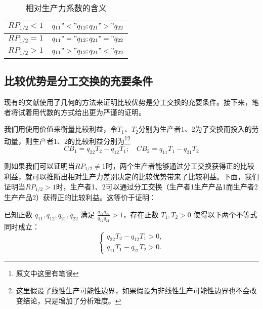 \begin{table}
    \centering
    \caption{相对生产力系数的含义\cite[48-49]{CaiJiMingCongXiaYiJieZhiLunDaoGuangYiJieZhiLunXiuDingBan2022}}
    \label{table:RP_{1/2}}
    \begin{tabular}{|l|l|}
    \hline
        $\mathit{RP}_{1/2}<1$ & $q_{11} \quad "<" \quad q_{12}; \quad q_{21} \quad ">" \quad q_{22}$ \\ \hline
        $\mathit{RP}_{1/2}=1$ & $q_{11} \quad "=" \quad q_{12}; \quad q_{21} \quad "=" \quad q_{22}$ \\ \hline
        $\mathit{RP}_{1/2}>1$ & $q_{11} \quad ">" \quad q_{12}; \quad q_{21} \quad "<" \quad q_{22}$ \\ \hline
    \end{tabular}
\end{table}

\subsection{比较优势是分工交换的充要条件}

现有的文献使用了几何的方法来证明比较优势是分工交换的充要条件。接下来，笔者将试着用代数的方式给出更为严谨的证明。

我们用使用价值来衡量比较利益\cite[63]{CaiJiMingGuangYiJieZhiLun2001}，令$T_1$、$T_2$分别为生产者1、2为了交换而投入的劳动量，则生产者1、2的比较利益分别为\footnote{原文中这里有笔误}\footnote{这里假设了线性生产可能性边界，如果假设为非线性生产可能性边界也不会改变结论，只是增加了分析难度\cite[285]{LiRenJunJieZhiLiLun2004}。}
\begin{equation}
    \mathit{CB}_1 = q_{22}T_2 - q_{12}T_1 ; \quad \mathit{CB}_2 = q_{11}T_1 - q_{21}T_2  
\end{equation}

则如果我们可以证明当$\mathit{RP}_{1/2} \neq 1$时，两个生产者能够通过分工交换获得正的比较利益，就可以推断出相对生产力差别决定的比较优势带来了比较利益。下面，我们证明当$RP_{1/2} > 1$时，生产者1、2可以通过分工交换（生产者1生产产品1而生产者2生产产品2）获得正的比较利益。这等价于证明：

\begin{proposition}
    已知正数 $ q_{11}, q_{12}, q_{21}, q_{22} $ 满足 $\frac{q_{11}q_{22}}{q_{12}q_{21}} > 1$，存在正数 $T_1,T_2 > 0$ 使得以下两个不等式同时成立：
    $$
        \begin{cases}
            q_{22}T_2 - q_{12}T_1 > 0, \\
            q_{11}T_1 - q_{21}T_2 > 0.
        \end{cases}
    $$    
\end{proposition}

